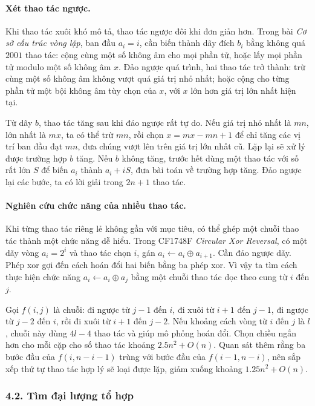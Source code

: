 \documentclass[11pt]{article}
\begin{document}
\paragraph{Xét thao tác ngược.}
Khi thao tác xuôi khó mô tả, thao tác ngược đôi khi đơn giản hơn. Trong bài
\emph{Cơ sở cấu trúc vòng lặp}, ban đầu \(a_i=i\), cần biến thành dãy đích
\(b_i\) bằng không quá \(2001\) thao tác: cộng cùng một số không âm cho mọi
phần tử, hoặc lấy mọi phần tử modulo một số không âm \(x\). Đảo ngược quá trình,
hai thao tác trở thành: trừ cùng một số không âm không vượt quá giá trị nhỏ
nhất; hoặc cộng cho từng phần tử một bội không âm tùy chọn của \(x\), với
\(x\) lớn hơn giá trị lớn nhất hiện tại.

Từ dãy \(b\), thao tác tăng sau khi đảo ngược rất tự do. Nếu giá trị nhỏ nhất
là \(mn\), lớn nhất là \(mx\), ta có thể trừ \(mn\), rồi chọn
\(x=mx-mn+1\) để chỉ tăng các vị trí ban đầu đạt \(mn\), đưa chúng vượt lên
trên giá trị lớn nhất cũ. Lặp lại sẽ xử lý được trường hợp \(b\) tăng. Nếu
\(b\) không tăng, trước hết dùng một thao tác với số rất lớn \(S\) để biến
\(a_i\) thành \(a_i+iS\), đưa bài toán về trường hợp tăng. Đảo ngược lại các
bước, ta có lời giải trong \(2n+1\) thao tác.

\paragraph{Nghiên cứu chức năng của nhiều thao tác.}
Khi từng thao tác riêng lẻ không gần với mục tiêu, có thể ghép một chuỗi thao
tác thành một chức năng dễ hiểu. Trong CF1748F \emph{Circular Xor Reversal},
có một dãy vòng \(a_i=2^i\) và thao tác chọn \(i\), gán
\(a_i\leftarrow a_i\oplus a_{i+1}\). Cần đảo ngược dãy. Phép xor gợi đến cách
hoán đổi hai biến bằng ba phép xor. Vì vậy ta tìm cách thực hiện chức năng
\(a_i\leftarrow a_i\oplus a_j\) bằng một chuỗi thao tác dọc theo cung từ \(i\)
đến \(j\).

Gọi \(f(i,j)\) là chuỗi: đi ngược từ \(j-1\) đến \(i\), đi xuôi từ \(i+1\) đến
\(j-1\), đi ngược từ \(j-2\) đến \(i\), rồi đi xuôi từ \(i+1\) đến \(j-2\).
Nếu khoảng cách vòng từ \(i\) đến \(j\) là \(l\), chuỗi này dùng \(4l-4\) thao
tác và giúp mô phỏng hoán đổi. Chọn chiều ngắn hơn cho mỗi cặp cho số thao tác
khoảng \(2.5n^2+O(n)\). Quan sát thêm rằng ba bước đầu của \(f(i,n-i-1)\) trùng
với bước đầu của \(f(i-1,n-i)\), nên sắp xếp thứ tự thao tác hợp lý sẽ loại
được lặp, giảm xuống khoảng \(1.25n^2+O(n)\).

\subsubsection*{4.2. Tìm đại lượng tổ hợp}
\end{document}
